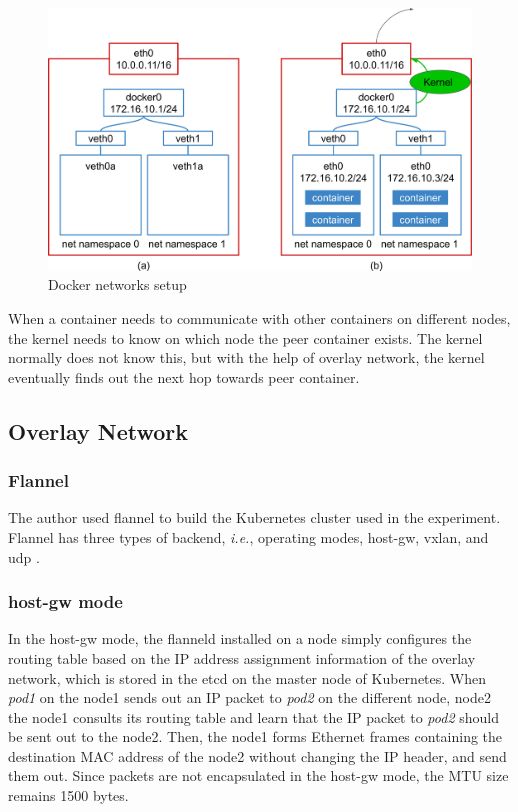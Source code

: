 \begin{figure}[h]
  \centering
  \includegraphics[width=0.8\columnwidth]{Figs/bridge+veth}

  \par\bigskip
  \centering
  \begin{minipage}{0.9\columnwidth}
    \caption[Docker networks setup]{
      Docker networks setup
    }
    \label{fig:bridge+veth}
  \end{minipage}
\end{figure}
 
When a container needs to communicate with other containers on different nodes, the kernel needs to know on which node the peer container exists.
The kernel normally does not know this, but with the help of overlay network, the kernel eventually finds out the next hop towards peer container.

\FloatBarrier

\subsection{Overlay Network}

\subsubsection{Flannel}

The author used flannel to build the Kubernetes cluster used in the experiment.
Flannel has three types of backend, {\it i.e.}, operating modes, host-gw, vxlan, and udp \cite{CoreOSFlannelBackend}.

\subsubsection{host-gw mode}

In the host-gw mode, the flanneld installed on a node simply configures the routing table  
based on the IP address assignment information of the overlay network, which is stored in the etcd on the master node of Kubernetes.
When {\em pod1} on the node1 sends out an IP packet to {\em pod2} on the different node, node2\added{,} 
the node1 consults its routing table and learn that the IP packet to {\em pod2} should be sent out to the node2.
Then, the node1 forms Ethernet frames containing the destination MAC address of the node2 
without changing the IP header, and send them out.
Since packets are not encapsulated in the host-gw mode, the MTU size remains 1500 bytes.

